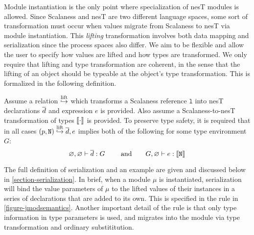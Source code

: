 Module instantiation is the only point where specialization of nesT modules is allowed. Since
Scalaness and nesT are two different language spaces, some sort of transformation must occur
when values migrate from Scalaness to nesT via module instantiation. This \emph{lifting}
transformation involves both data mapping and serialization since the process spaces also
differ. We aim to be flexible and allow the user to specify how values are lifted and how types
are transformed. We only require that lifting and type transformation are coherent, in the sense
that the lifting of an object should be typeable at the object's type transformation. This is
formalized in the following definition.
\begin{definition}
\label{def-lifting}
Assume a relation $\overset{\text{lift}}{\hookrightarrow}$ which transforms a Scalaness reference $\texttt{l}$ into nesT
declarations $\overline{d}$ and expression $e$ is provided. Also assume a Scalaness-to-nesT
transformation of types $\llbracket \cdot \rrbracket$ is provided. To preserve type safety, it is required that
in all cases $\mathtt{(}p,\mathtt{N)} \overset{\text{lift}}{\hookrightarrow} \overline{d}, e$ implies both of the following for some type
environment $G$:
$$
\varnothing, \varnothing \vdash \overline{d} : G \qquad \text{ and} \qquad
 G, \varnothing \vdash e : \llbracket \texttt{N} \rrbracket 
$$
\end{definition}
The full definition of serialization and an example are given and discussed below in
\autoref{section-serialization}. In brief, when a module $\mu$ is instantiated, serialization
will bind the value parameters of $\mu$ to the lifted values of their instances in a series of
declarations that are added to its own. This is specified in the  rule in
\autoref{figure-jmodsemantics}. Another important detail of the  rule is that
only type information in type parameters is used, and migrates into the module via type
transformation and ordinary substititution.

\jmodsemanticsfig

